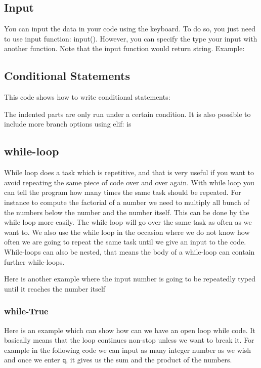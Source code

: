 \documentclass[10pt,a4paper]{article}
\begin{document}
\subsection{Input}
\label{subsec:Input}
You can input the data in your code using the keyboard. To do so, you just need to use input function: input(). However, you can specify the type your input with another function. Note that the input function would return string.
Example:



\subsection{Conditional Statements}
This code shows how to write conditional statements:

The indented parts are only run under a certain condition.
It is also possible to include more branch options using elif:
is


\subsection{while-loop}
While loop does a task which is repetitive, and that is very useful if you want to avoid repeating the same piece  of code over and over again.  With while loop you can tell the program how many times the same task should be repeated. 
For instance to compute the factorial of a number we need to multiply all bunch of the numbers below the number and the number itself. This can be done by the while loop more easily. The while loop will go over the same task as often as we want to. We also use the while loop in the occasion where we do not know how often we are going to repeat the same task until we give an input to the code. While-loops can also be
nested, that means the body of a while-loop can contain further while-loops.

Here is another example where the input number is going to be repeatedly typed until it reaches the number itself

\subsubsection{while-True}
Here is an example which can show how can we have an open loop while code. It basically means that the loop continues non-stop unless we want to break it. For example in the following code we can input as many integer number as we wish and once we enter \texttt{q}, it gives us the sum and the product of the numbers.

\end{document}
